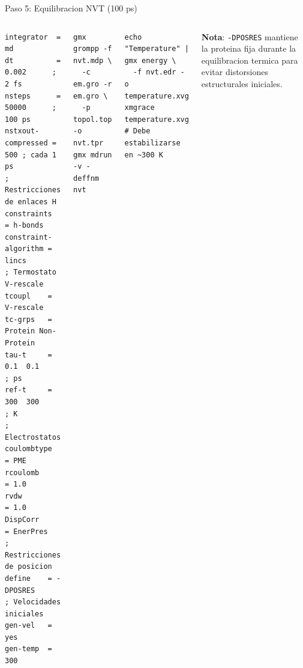 \documentclass[aspectratio=169, 10pt]{beamer}
\begin{document}
\begin{frame}[fragile,shrink=3]{Paso 5: Equilibracion NVT (100 ps)}
\begin{columns}[T]
\begin{tcolorbox}[warningbox, title={nvt.mdp --- parametros clave}]
\begin{lstlisting}[style=mdpstyle]
integrator  = md
dt          = 0.002      ; 2 fs
nsteps      = 50000      ; 100 ps
nstxout-compressed = 500 ; cada 1 ps
; Restricciones de enlaces H
constraints         = h-bonds
constraint-algorithm = lincs
; Termostato V-rescale
tcoupl    = V-rescale
tc-grps   = Protein Non-Protein
tau-t     = 0.1  0.1     ; ps
ref-t     = 300  300     ; K
; Electrostatos
coulombtype  = PME
rcoulomb     = 1.0
rvdw         = 1.0
DispCorr     = EnerPres
; Restricciones de posicion
define    = -DPOSRES
; Velocidades iniciales
gen-vel   = yes
gen-temp  = 300
\end{lstlisting}
\end{tcolorbox}
\begin{tcolorbox}[definitionbox, title={Ejecutar NVT}]
\begin{lstlisting}[style=bashstyle]
gmx grompp -f nvt.mdp \
  -c em.gro -r em.gro \
  -p topol.top -o nvt.tpr
gmx mdrun -v -deffnm nvt
\end{lstlisting}
\end{tcolorbox}
\begin{tcolorbox}[definitionbox, title={Verificar temperatura}]
\begin{lstlisting}[style=bashstyle]
echo "Temperature" | gmx energy \
  -f nvt.edr -o temperature.xvg
xmgrace temperature.xvg
# Debe estabilizarse en ~300 K
\end{lstlisting}
\end{tcolorbox}
\begin{tcolorbox}[comparisonbox]
\small\textbf{Nota}: \texttt{-DPOSRES} mantiene la
proteina fija durante la equilibracion
termica para evitar distorsiones
estructurales iniciales.
\end{tcolorbox}
\end{columns}
\end{frame}
\end{document}

